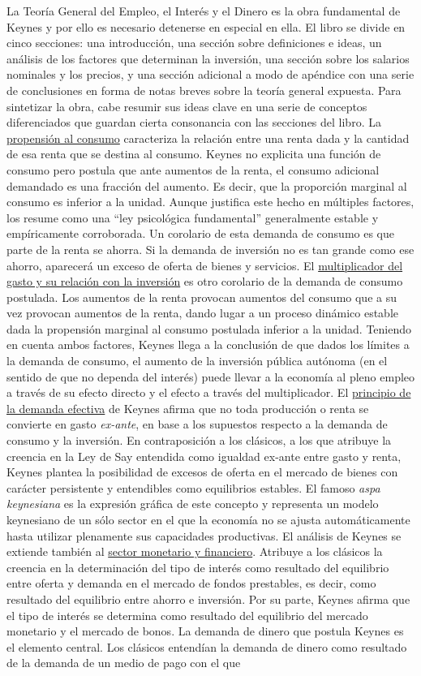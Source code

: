 \documentclass{nuevotema}
\begin{document}
La Teoría General del Empleo, el Interés y el Dinero es la obra fundamental de Keynes y por ello es necesario detenerse en especial en ella. El libro se divide en cinco secciones: una introducción, una sección sobre definiciones e ideas, un análisis de los factores que determinan la inversión, una sección sobre los salarios nominales y los precios, y una sección adicional a modo de apéndice con una serie de conclusiones en forma de notas breves sobre la teoría general expuesta. Para sintetizar la obra, cabe resumir sus ideas clave en una serie de conceptos diferenciados que guardan cierta consonancia con las secciones del libro. La \underline{propensión al consumo} caracteriza la relación entre una renta dada y la cantidad de esa renta que se destina al consumo. Keynes no explicita una función de consumo pero postula que ante aumentos de la renta, el consumo adicional demandado es una fracción del aumento. Es decir, que la proporción marginal al consumo es inferior a la unidad. Aunque justifica este hecho en múltiples factores, los resume como una ``ley psicológica fundamental'' generalmente estable y empíricamente corroborada. Un corolario de esta demanda de consumo es que parte de la renta se ahorra. Si la demanda de inversión no es tan grande como ese ahorro, aparecerá un exceso de oferta de bienes y servicios. El \underline{multiplicador del gasto y su relación con la inversión} es otro corolario de la demanda de consumo postulada. Los aumentos de la renta provocan aumentos del consumo que a su vez provocan aumentos de la renta, dando lugar a un proceso dinámico estable dada la propensión marginal al consumo postulada inferior a la unidad. Teniendo en cuenta ambos factores, Keynes llega a la conclusión de que dados los límites a la demanda de consumo, el aumento de la inversión pública autónoma (en el sentido de que no dependa del interés) puede llevar a la economía al pleno empleo a través de su efecto directo y el efecto a través del multiplicador. El \underline{principio de la demanda efectiva} de Keynes afirma que no toda producción o renta se convierte en gasto \textit{ex-ante}, en base a los supuestos respecto a la demanda de consumo y la inversión. En contraposición a los clásicos, a los que atribuye la creencia en la Ley de Say entendida como igualdad ex-ante entre gasto y renta, Keynes plantea la posibilidad de excesos de oferta en el mercado de bienes con carácter persistente y entendibles como equilibrios estables. El famoso \textit{aspa keynesiana} es la expresión gráfica de este concepto y representa un modelo keynesiano de un sólo sector en el que la economía no se ajusta automáticamente hasta utilizar plenamente sus capacidades productivas. El análisis de Keynes se extiende también al \underline{sector monetario y financiero}. Atribuye a los clásicos la creencia en la determinación del tipo de interés como resultado del equilibrio entre oferta y demanda en el mercado de fondos prestables, es decir, como resultado del equilibrio entre ahorro e inversión. Por su parte, Keynes afirma que el tipo de interés se determina como resultado del equilibrio del mercado monetario y el mercado de bonos. La demanda de dinero que postula Keynes es el elemento central. Los clásicos entendían la demanda de dinero como resultado de la demanda de un medio de pago con el que 
\end{document}
